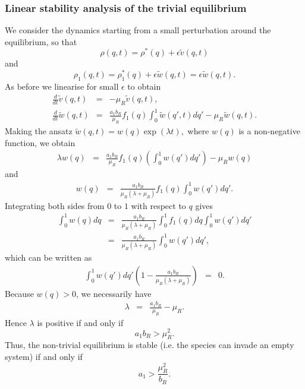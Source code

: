 \documentclass[8pt,a4paper]{article}
\begin{document}
\subsubsection*{Linear stability analysis of the trivial equilibrium}
We consider the dynamics starting from a small perturbation around the equilibrium, so that  $$\rho(q,t)=\rho^*(q)+\epsilon \tilde{v}(q,t)$$ and $$\rho_1(q,t)=\rho_1^*(q)+ \epsilon \tilde{w}(q,t)= \epsilon \tilde{w}(q,t).$$
As before we linearise for small $\epsilon$ to obtain
\begin{eqnarray*}
\frac{d}{dt} \tilde{v}(q,t) &=& - \mu_R \tilde{v}(q,t),\\
\frac{d}{dt} \tilde{w}(q,t) &=& \frac{a_1 b_R}{\mu_R}f_1(q) \int_0^1 \tilde{w}(q',t) dq' -\mu_R \tilde{w}(q,t).
\end{eqnarray*}
Making the ansatz $\tilde{w}(q,t)= w(q) \exp(\lambda t),$ where $w(q)$ is a non-negative function, we obtain
\begin{eqnarray*}
\lambda w(q)&=& \frac{a_1 b_R}{\mu_R}f_1(q) \left(\int_0^1 w(q') dq'\right) -\mu_R w(q) 
\end{eqnarray*}
and 
\begin{eqnarray*}
w(q) &=& \frac{a_1 b_R}{\mu_R (\lambda+\mu_R)}f_1(q) \int_0^1 w(q') dq'. 
\end{eqnarray*}
Integrating both sides from $0$ to $1$ with respect to $q$ gives
\begin{eqnarray*}
\int_0^1 w(q) dq &=& \frac{a_1 b_R}{\mu_R (\lambda+\mu_R)} \int_0^1 f_1(q) dq \int_0^1 w(q') dq'\\
&= &  \frac{a_1 b_R}{\mu_R (\lambda+\mu_R)} \int_0^1 w(q') dq',
\end{eqnarray*}
which can be written as
\begin{eqnarray*}
 \int_0^1 w(q') dq' \left(1-\frac{a_1 b_R}{\mu_R(\lambda+\mu_R)}\right) &=& 0.
\end{eqnarray*}
Because $w(q)>0$, we necessarily have
\begin{eqnarray*}
 \lambda &=& \frac{a_1 b_R}{\mu_R}-\mu_R.
\end{eqnarray*}
Hence $\lambda$ is positive if and only if
\begin{equation*}
a_1 b_R >\mu_R^2.
\end{equation*}
Thus, the non-trivial equilibrium is stable (i.e. the species can invade an empty system) if and only if
\begin{equation}
a_1> \frac{\mu_R^2}{b_R}.
\end{equation}
\end{document}
